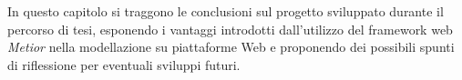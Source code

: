 In questo capitolo si traggono le conclusioni sul progetto sviluppato durante il percorso di tesi, esponendo i vantaggi introdotti
dall'utilizzo del framework web \emph{Metior} nella modellazione su piattaforme Web e proponendo dei possibili spunti di riflessione
per eventuali sviluppi futuri.
